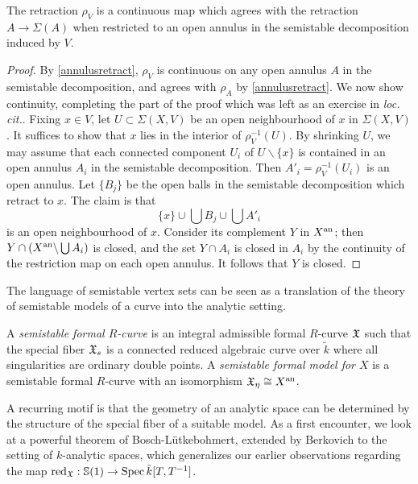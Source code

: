 \begin{lemma}\parencite[Lemma 3.8]{bpr}
The retraction $\rho_{V}$ is a continuous map which agrees with the retraction $A \to \Sigma(A)$ when restricted to an open annulus in the semistable decomposition induced by $V$.
\end{lemma}
\begin{proof}
    By \cref{annulusretract}, $\rho_V$ is continuous on any open annulus $A$ in the semistable decomposition, and agrees with $\rho_{A}$ by \cref{annulusretract}.
    We now show continuity, completing the part of the proof which was left as an exercise in \textit{loc. cit.}.
    Fixing $x \in V$, let $U \subset \Sigma(X, V)$ be an open neighbourhood of $x$ in $\Sigma(X, V)$.
    It suffices to show that $x$ lies in the interior of $\rho_V^{-1}(U)$.
    By shrinking $U$, we may assume that each connected component $U_i$ of $U \backslash \{ x \}$ is contained in an open annulus $A_i$ in the semistable decomposition.
    Then $A'_i  = \rho_V^{-1}(U_i)$ is an open annulus.
    Let $\{B_j\}$ be the open balls in the semistable decomposition which retract to $x$.
    The claim is that 
    \[
        \{ x \} \cup \bigcup B_j \cup \bigcup A'_i
    \]
    is an open neighbourhood of $x$. 
    Consider its complement $Y$ in $X^{\text{an}}$; then $Y \cap (X^{\text{an}}  \backslash \bigcup A_i)$ is closed, and the set $Y \cap A_i$ is closed in $A_i$ by the continuity of the restriction map on each open annulus.
    It follows that $Y$ is closed.
\end{proof}

The language of semistable vertex sets can be seen as a translation of the theory of semistable models of a curve into the analytic setting.

\begin{defn}\parencite[\S 4]{bpr}
    A \textit{semistable formal $R$-curve} is an integral admissible formal $R$-curve $\mathfrak{X}$ such that the special fiber $\mathfrak{X}_s$ is a connected reduced algebraic curve over $\tilde{k}$ where all singularities are ordinary double points.
    A \textit{semistable formal model for $X$} is a semistable formal $R$-curve with an isomorphism $\mathfrak{X}_\eta \cong X^{\text{an}}$.
\end{defn}

A recurring motif is that the geometry of an analytic space can be determined by the structure of the special fiber of a suitable model.
As a first encounter, we look at a powerful theorem of Bosch-L{\"u}tkebohmert, extended by Berkovich to the setting of $k$-analytic spaces, which generalizes our earlier observations regarding the map $\operatorname{red}_{\mathfrak{X}}: \mathbb{S}(1) \to \operatorname{Spec} \tilde{k}[T, T^{-1}]$.

